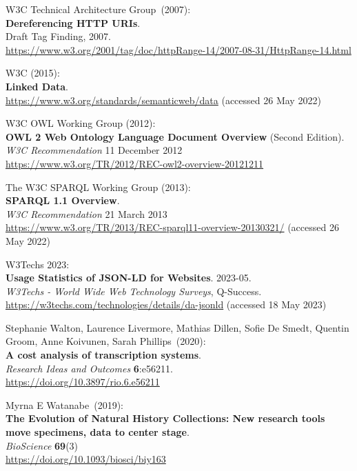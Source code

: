 \begin{thebibliography}{9}
W3C Technical Architecture Group~(2007):\\
\textbf{Dereferencing HTTP URIs}.\\
Draft Tag Finding, 2007.\\
\url{https://www.w3.org/2001/tag/doc/httpRange-14/2007-08-31/HttpRange-14.html}

W3C (2015): \\
\textbf{Linked Data}.\\
\url{https://www.w3.org/standards/semanticweb/data} (accessed 26 May
2022)

W3C OWL Working Group (2012): \\
\textbf{{OWL} 2 {Web Ontology Language Document Overview}} ({Second Edition}). \\
\emph{W3C Recommendation} 11 December 2012 \\
\url{https://www.w3.org/TR/2012/REC-owl2-overview-20121211} 

The W3C SPARQL Working Group (2013):\\
\textbf{{SPARQL} 1.1 {Overview}}. \\
\emph{W3C Recommendation} 21 March 2013 \\
\url{https://www.w3.org/TR/2013/REC-sparql11-overview-20130321/} (accessed 26 May 2022)

W3Techs 2023: \\
\textbf{Usage Statistics of JSON-LD for Websites}. 2023-05. \\
\emph{W3Techs - World Wide Web Technology Surveys}, Q-Success.\\
\url{https://w3techs.com/technologies/details/da-jsonld} (accessed 18
May 2023)

Stephanie Walton, Laurence Livermore, Mathias Dillen, Sofie De Smedt, Quentin Groom, Anne Koivunen, Sarah Phillips~(2020):\\
\textbf{A cost analysis of transcription systems}. \\
\emph{Research Ideas and Outcomes} \textbf{6}:e56211.\\
\url{https://doi.org/10.3897/rio.6.e56211}

Myrna E Watanabe~(2019):\\
\textbf{The Evolution of Natural History Collections:
New research tools move specimens, data to center stage}.\\
\emph{BioScience} \textbf{69}(3)\\
\url{https://doi.org/10.1093/biosci/biy163}


\end{thebibliography}
